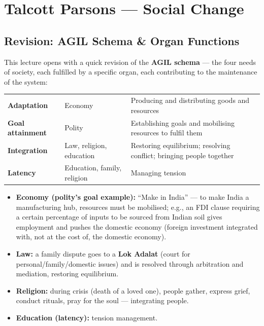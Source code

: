 \sectiondivider

\section{Talcott Parsons --- Social Change}

\subsection{Revision: AGIL Schema \& Organ Functions}

This lecture opens with a quick revision of the \textbf{AGIL schema} --- the four needs of society, each fulfilled by a specific organ, each contributing to the maintenance of the system:

\begin{center}
\begin{tabularx}{\textwidth}{p{3.2cm} p{4cm} Y}
 &  &  \\
\midrule
\textbf{Adaptation} & Economy & Producing and distributing goods and resources \\
\textbf{Goal attainment} & Polity & Establishing goals and mobilising resources to fulfil them \\
\textbf{Integration} & Law, religion, education & Restoring equilibrium; resolving conflict; bringing people together \\
\textbf{Latency} & Education, family, religion & Managing tension \\
\bottomrule
\end{tabularx}
\end{center}

\begin{ExampleBox}
\begin{itemize}
\item \textbf{Economy (polity's goal example):} ``Make in India'' --- to make India a manufacturing hub, resources must be mobilised; e.g., an FDI clause requiring a certain percentage of inputs to be sourced from Indian soil gives employment and pushes the domestic economy (foreign investment integrated with, not at the cost of, the domestic economy).
\item \textbf{Law:} a family dispute goes to a \textbf{Lok Adalat} (court for personal/family/domestic issues) and is resolved through arbitration and mediation, restoring equilibrium.
\item \textbf{Religion:} during crisis (death of a loved one), people gather, express grief, conduct rituals, pray for the soul --- integrating people.
\item \textbf{Education (latency):} tension management.
\end{itemize}
\end{ExampleBox}

